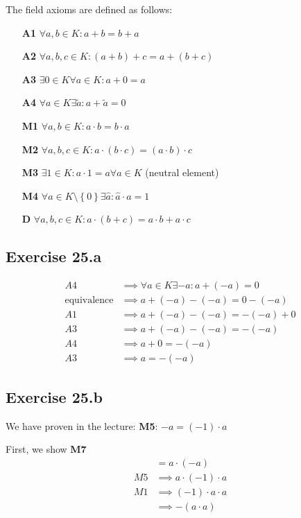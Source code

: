 \documentclass[a4paper]{article}
\theoremstyle{definition}
\newcommand\set[1]{\left\{#1\right\}}
\begin{document}
The field axioms are defined as follows:
\begin{itemize}
  \item[\textbf{A1}] $\forall a,b \in K: a + b = b + a$
  \item[\textbf{A2}] $\forall a,b,c \in K: (a + b) + c = a + (b + c)$
  \item[\textbf{A3}] $\exists 0 \in K \forall a \in K: a + 0 = a$
  \item[\textbf{A4}] $\forall a \in K \exists \tilde{a}: a + \tilde{a} = 0$
  \item[\textbf{M1}] $\forall a,b \in K: a \cdot b = b \cdot a$
  \item[\textbf{M2}] $\forall a,b,c \in K: a \cdot (b \cdot c) = (a \cdot b) \cdot c$
  \item[\textbf{M3}] $\exists 1 \in K: a \cdot 1 = a \forall a \in K$ (neutral element)
  \item[\textbf{M4}] $\forall a \in K \setminus \set{0} \exists \hat a: \hat a \cdot a = 1$
  \item[\textbf{D}] $\forall a,b,c \in K: a \cdot (b + c) = a \cdot b + a \cdot c$
\end{itemize}

\subsection{Exercise 25.a}

\begin{align*}
                  A4 &\implies \forall a \in K \exists -a: a + (-a) = 0 \\
  \text{equivalence} &\implies a + (-a) - (-a) = 0 - (-a) \\
                  A1 &\implies a + (-a) - (-a) = -(-a) + 0 \\
                  A3 &\implies a + (-a) - (-a) = -(-a) \\
                  A4 &\implies a + 0 = -(-a) \\
                  A3 &\implies a = -(-a)
\end{align*}

\subsection{Exercise 25.b}

We have proven in the lecture: \textbf{M5}: $-a = (-1) \cdot a$


First, we show \textbf{M7}
\begin{align*}
     &= a \cdot (-a) \\
  M5 &\implies a \cdot (-1) \cdot a \\
  M1 &\implies (-1) \cdot a \cdot a \\
     &\implies - (a \cdot a) \\
\end{align*}
\end{document}
